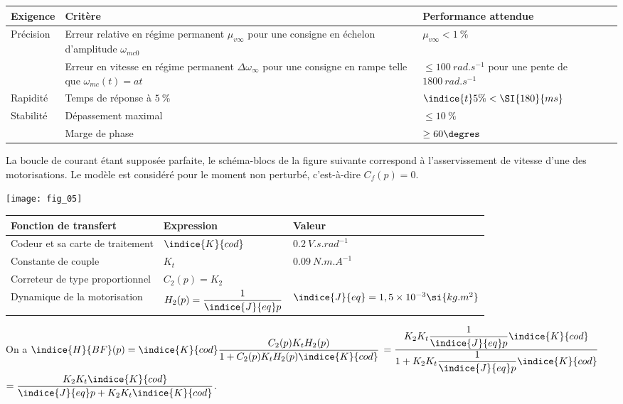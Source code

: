 \footnotesize
\begin{table*}
\begin{tabular}{lp{11cm}p{4cm}}
\hline
\textbf{Exigence} & \textbf{Critère} & \textbf{Performance attendue} \\
\hline
\multirow{2}{*}{Précision} & 
Erreur relative en régime permanent $\mu_{v\infty}$ pour une consigne en échelon d'amplitude $\omega_{mc0}$ & $\mu_{v\infty} < \SI{1}{\%}$ \\
& Erreur en vitesse en régime permanent $\Delta \omega_{\infty}$ pour une consigne en rampe telle que $\omega_{mc}(t)  = at$ & $\leq \SI{100}{rad.s^{-1}}$ pour une pente de $\SI{1800}{rad.s^{-1}}$ \\
Rapidité & Temps de réponse à $\SI{5}{\%}$ & $\indice{t}{5\%} < \SI{180}{ms}$ \\
\multirow{2}{*}{Stabilité} & Dépassement maximal & $\leq \SI{10}{\%}$  \\
& Marge de phase & $\geq 60\degres$  \\
\hline
\end{tabular}
\end{table*}

\normalsize


La boucle de courant étant supposée parfaite, le schéma-blocs de la figure suivante correspond à l’asservissement de
vitesse d’une des motorisations. Le modèle est considéré pour le moment non perturbé, c’est-à-dire $C_f(p)=0$.

\begin{center}
\texttt{[image: fig\_05]}
\end{center}


\begin{center}
\begin{tabular}{lll}
\hline
\textbf{Fonction de transfert} & \textbf{Expression} & \textbf{Valeur} \\
\hline
Codeur et sa carte de traitement & $\indice{K}{cod}$ & $\SI{0,2}{V.s.rad^{-1}}$ \\
Constante de couple & $K_t$ & $\SI{0,09}{N.m.A^{-1}}$ \\
Correteur de type proportionnel & $C_2(p) = K_2 $ &  \\
Dynamique de la motorisation & $H_2(p)=\dfrac{1}{\indice{J}{eq}p}$ & $\indice{J}{eq} = 1,5\times 10^{-3} \si{kg.m^2}$ \\
\hline
\end{tabular}
\end{center}

\ifprof
\begin{corrige}
On a 
$\indice{H}{BF}(p) =  \indice{K}{cod}   \dfrac{C_2(p)K_t H_2(p)}{1+C_2(p)K_t H_2(p)\indice{K}{cod}}$
$=    \dfrac{K_2K_t \dfrac{1}{\indice{J}{eq}p}\indice{K}{cod}}{1+K_2K_t \dfrac{1}{\indice{J}{eq}p}\indice{K}{cod}}$
$=    \dfrac{K_2K_t \indice{K}{cod}}{\indice{J}{eq}p+K_2K_t \indice{K}{cod}}$.
\end{corrige}
\else
\fi

